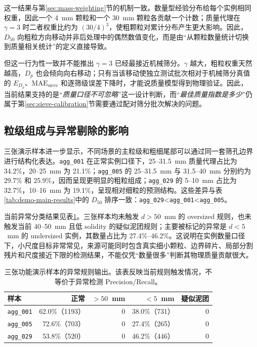 这一结果与第\ref{sec:mass-weighting}节的机制一致。数量型经验分布给每个实例相同权重，因此一个 4~mm 颗粒和一个 30~mm 颗粒各贡献一个计数；质量代理在 $\gamma=3$ 时二者权重比约为 $(30/4)^3$，使粗颗粒对累计分布产生更大影响。因此，$D_{50}$ 向粗粒方向移动并非后处理中的偶然数值变化，而是由“从颗粒数量统计切换到质量相关统计”的定义直接导致。

但这一行为性一致并不能推出 $\gamma=3$ 已经最接近机械筛分。$\gamma$ 越大，粗粒权重天然越高，$D_p$ 也会倾向向右移动；只有当该移动使独立测试批次相对于机械筛分真值的 $E_{D_p}$、$\mathrm{MAE}_{\mathrm{sieve}}$ 和逐筛级误差下降时，才能说质量模型得到物理验证。因此，当前结果支持的是“\emph{质量口径不可忽略}”这一设计判断，而“\emph{最佳质量指数是多少}”仍属于第\ref{sec:sieve-calibration}节需要通过配对筛分批次解决的问题。

\subsection{粒级组成与异常剔除的影响}
\label{sec:grading-anomaly-results}

三张演示样本进一步显示，不同场景的主粒级和粗细尾部可以通过同一套筛孔边界进行结构化表达。\texttt{agg\_001} 在正常实例口径下，25--31.5~mm 质量代理占比为 34.2\%，20--25~mm 为 21.1\%；\texttt{agg\_005} 的 25--31.5~mm 与 31.5--40~mm 分别约为 29.7\% 和 25.9\%，因而呈现更明显的粗粒组成；\texttt{agg\_029} 的 5--10~mm 占比为 32.7\%，10--16~mm 为 19.1\%，呈现相对细粒的预测结构。这些差异与表\ref{tab:demo-main-results}中的 $D_{50}$ 排序一致：\texttt{agg\_029}<\texttt{agg\_001}<\texttt{agg\_005}。

当前异常分类结果见表\ref{tab:demo-anomaly-results}。三张样本均未触发 $d>50$~mm 的 oversized 规则，也未触发当前 40--50~mm 且低 solidity 的疑似泥团规则；主要被标记的异常是 $d<5$~mm 的 undersized 实例，其数量占比为 27.4\%--46.2\%。这说明在实例数量口径下，小尺度目标非常常见，来源可能同时包含真实细小颗粒、边界碎片、局部分割残片和尺度接近下限的检测结果，不能仅凭“数量很多”判断其物理质量贡献很大。

\begin{table}[htbp]
\centering
\caption{三张功能演示样本的异常规则输出。该表反映当前规则触发情况，不等价于异常检测 Precision/Recall。}
\label{tab:demo-anomaly-results}
\small
\renewcommand{\arraystretch}{1.15}
\begin{tabular}{lrrrr}
\toprule
样本 & 正常 & $>50$~mm & $<5$~mm & 疑似泥团 \\
\midrule
\texttt{agg\_001} & 62.0\%（1193） & 0 & 38.0\%（731） & 0 \\
\texttt{agg\_005} & 72.6\%（703）  & 0 & 27.4\%（265） & 0 \\
\texttt{agg\_029} & 53.8\%（520）  & 0 & 46.2\%（446） & 0 \\
\bottomrule
\end{tabular}
\end{table}

